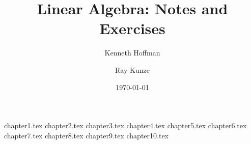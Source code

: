 \documentclass{linear-algebra}
\title{Linear Algebra: Notes and Exercises}
\author{Kenneth Hoffman\and Ray Kunze}
\date{\today}
\begin{document}
\maketitle

\tableofcontents

{chapter1.tex}
{chapter2.tex}
{chapter3.tex}
{chapter4.tex}
{chapter5.tex}
{chapter6.tex}
{chapter7.tex}
{chapter8.tex}
{chapter9.tex}
{chapter10.tex}
\end{document}
